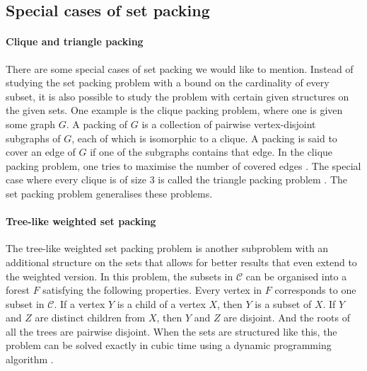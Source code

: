 
\subsection{Special cases of set packing}

\paragraph{Clique and triangle packing} There are some special cases of set packing we would like to mention. Instead of studying the set packing problem with a bound on the cardinality of every subset, it is also possible to study the problem with certain given structures on the given sets. One example is the clique packing problem, where one is given some graph $G$. A packing of $G$ is a collection of pairwise vertex-disjoint subgraphs of $G$, each of which is isomorphic to a clique. A packing is said to cover an edge of $G$ if one of the subgraphs contains that edge. In the clique packing problem, one tries to maximise the number of covered edges \cite{CliquePacking}. The special case where every clique is of size 3 is called the triangle packing problem \cite{TrianglePacking2,TrianglePacking1}. The set packing problem generalises these problems.


\paragraph{Tree-like weighted set packing} The tree-like weighted set packing problem is another subproblem with an additional structure on the sets that allows for better results that even extend to the weighted version. In this problem, the subsets in $\mathcal{C}$ can be organised into a forest $F$ satisfying the following properties. Every vertex in $F$ corresponds to one subset in $\mathcal{C}$. If a vertex $Y$ is a child of a vertex $X$, then $Y$ is a subset of $X$. If $Y$ and $Z$ are distinct children from $X$, then $Y$ and $Z$ are disjoint. And the roots of all the trees are pairwise disjoint. When the sets are structured like this, the problem can be solved exactly in cubic time using a dynamic programming algorithm \cite{TreeSP}.

